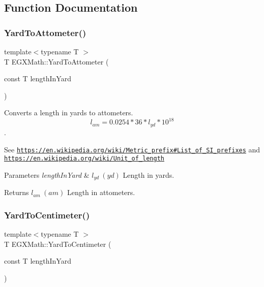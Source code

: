 \subsection{Function Documentation}
\mbox{\label{group___e_g_x_math-_conversions-_length_conversions-_imperial-_yard-_s_i_ga312090ed214669c04e4dd8a80c42ccf4}} 
\subsubsection{\texorpdfstring{Yard\+To\+Attometer()}{YardToAttometer()}}
{\footnotesize\ttfamily template$<$typename T $>$ \\
T E\+G\+X\+Math\+::\+Yard\+To\+Attometer (\begin{DoxyParamCaption}\item[{const T}]{length\+In\+Yard }\end{DoxyParamCaption})}



Converts a length in yards to attometers. \[ l_{am}=0.0254 * 36 * l_{yd} * 10^{18} \]. 

See \href{https://en.wikipedia.org/wiki/Metric_prefix#List_of_SI_prefixes}{\tt https\+://en.\+wikipedia.\+org/wiki/\+Metric\+\_\+prefix\#\+List\+\_\+of\+\_\+\+S\+I\+\_\+prefixes} and \href{https://en.wikipedia.org/wiki/Unit_of_length}{\tt https\+://en.\+wikipedia.\+org/wiki/\+Unit\+\_\+of\+\_\+length} 
\begin{DoxyParams}{Parameters}
{\em length\+In\+Yard} & $ l_{yd}\ (yd)$ Length in yards. \\
\hline
\end{DoxyParams}
\begin{DoxyReturn}{Returns}
$ l_{am}\ (am)$ Length in attometers. 
\end{DoxyReturn}
\mbox{\label{group___e_g_x_math-_conversions-_length_conversions-_imperial-_yard-_s_i_gaf49d610207ac1f0469190e6a06d10a42}} 
\subsubsection{\texorpdfstring{Yard\+To\+Centimeter()}{YardToCentimeter()}}
{\footnotesize\ttfamily template$<$typename T $>$ \\
T E\+G\+X\+Math\+::\+Yard\+To\+Centimeter (\begin{DoxyParamCaption}\item[{const T}]{length\+In\+Yard }\end{DoxyParamCaption})}



